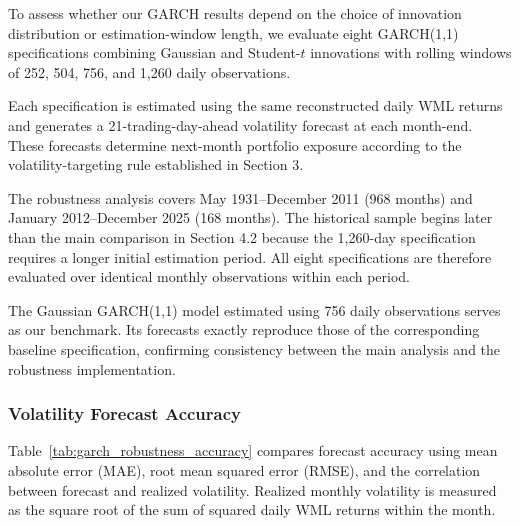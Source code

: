 \documentclass[11pt]{article}
\begin{document}
To assess whether our GARCH results depend on the choice
of innovation distribution or estimation-window length,
we evaluate eight GARCH(1,1) specifications combining
Gaussian and Student-$t$ innovations with rolling windows
of 252, 504, 756, and 1,260 daily observations.

Each specification is estimated using the same reconstructed
daily WML returns and generates a 21-trading-day-ahead
volatility forecast at each month-end. These forecasts
determine next-month portfolio exposure according to
the volatility-targeting rule established in
Section 3.

The robustness analysis covers May 1931--December 2011
(968 months) and January 2012--December 2025
(168 months). The historical sample begins later than
the main comparison in Section 4.2 because the
1,260-day specification requires a longer initial
estimation period. All eight specifications are
therefore evaluated over identical monthly observations
within each period.

The Gaussian GARCH(1,1) model estimated using
756 daily observations serves as our benchmark.
Its forecasts exactly reproduce those of the
corresponding baseline specification, confirming
consistency between the main analysis and the
robustness implementation.


\subsubsection{Volatility Forecast Accuracy}

Table~\ref{tab:garch_robustness_accuracy} compares forecast
accuracy using mean absolute error (MAE), root mean squared
error (RMSE), and the correlation between forecast and realized
volatility. Realized monthly volatility is measured as the square
root of the sum of squared daily WML returns within the month.
\end{document}
